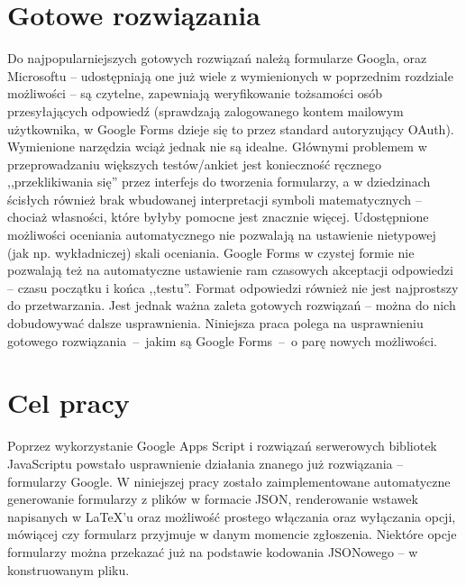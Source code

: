 \section{Gotowe rozwiązania}
Do najpopularniejszych gotowych rozwiązań należą formularze Googla, oraz Microsoftu -- udostępniają one już wiele z  wymienionych w poprzednim rozdziale możliwości -- są czytelne, zapewniają weryfikowanie  tożsamości osób przesyłających odpowiedź (sprawdzają zalogowanego kontem mailowym użytkownika, w Google Forms dzieje się  to przez standard autoryzujący OAuth).
\ind Wymienione narzędzia wciąż jednak nie są idealne. Głównymi problemem w przeprowadzaniu większych testów/ankiet jest konieczność ręcznego ,,przeklikiwania się'' przez interfejs do tworzenia formularzy, a w dziedzinach ścisłych również brak wbudowanej interpretacji symboli matematycznych -- chociaż własności, które byłyby pomocne jest znacznie więcej. Udostępnione możliwości oceniania automatycznego nie pozwalają na ustawienie nietypowej (jak np. wykładniczej) skali oceniania. Google Forms w czystej formie nie pozwalają też na automatyczne ustawienie ram czasowych akceptacji odpowiedzi -- czasu początku i końca ,,testu''. Format odpowiedzi również nie jest najprostszy do przetwarzania.
\ind Jest jednak ważna zaleta gotowych rozwiązań -- można do nich dobudowywać dalsze usprawnienia. Niniejsza praca polega na usprawnieniu gotowego rozwiązania~--~jakim są Google Forms~--~o parę nowych możliwości.
\section{Cel pracy}
 Poprzez wykorzystanie Google Apps Script  i rozwiązań serwerowych bibliotek JavaScriptu powstało  usprawnienie działania znanego już rozwiązania -- formularzy Google. W niniejszej pracy zostało zaimplementowane automatyczne generowanie formularzy z plików w formacie JSON, renderowanie wstawek napisanych w \LaTeX{}'u oraz możliwość prostego włączania oraz wyłączania opcji, mówiącej czy formularz przyjmuje w danym momencie zgłoszenia. Niektóre opcje formularzy można  przekazać już na podstawie kodowania JSONowego -- w konstruowanym pliku.

